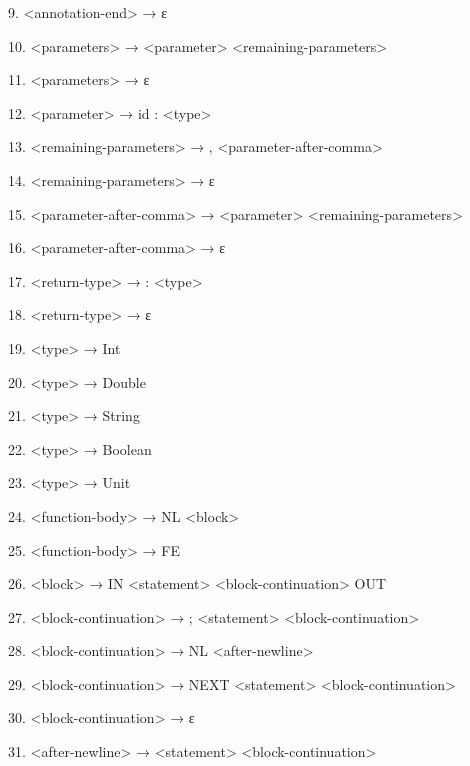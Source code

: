\documentclass{article}
\begin{document}
9. \textless annotation-end\textgreater{} → ε

10. \textless parameters\textgreater{} → \textless parameter\textgreater{} \textless remaining-parameters\textgreater{}

11. \textless parameters\textgreater{} → ε

12. \textless parameter\textgreater{} → id : \textless type\textgreater{}

13. \textless remaining-parameters\textgreater{} → , \textless parameter-after-comma\textgreater{}

14. \textless remaining-parameters\textgreater{} → ε

15. \textless parameter-after-comma\textgreater{} → \textless parameter\textgreater{} \textless remaining-parameters\textgreater{}

16. \textless parameter-after-comma\textgreater{} → ε

17. \textless return-type\textgreater{} → : \textless type\textgreater{}

18. \textless return-type\textgreater{} → ε

19. \textless type\textgreater{} → Int

20. \textless type\textgreater{} → Double

21. \textless type\textgreater{} → String

22. \textless type\textgreater{} → Boolean

23. \textless type\textgreater{} → Unit

24. \textless function-body\textgreater{} → NL \textless block\textgreater{}

25. \textless function-body\textgreater{} → FE

26. \textless block\textgreater{} → IN \textless statement\textgreater{} \textless block-continuation\textgreater{} OUT

27. \textless block-continuation\textgreater{} → ; \textless statement\textgreater{} \textless block-continuation\textgreater{}

28. \textless block-continuation\textgreater{} → NL \textless after-newline\textgreater{}

29. \textless block-continuation\textgreater{} → NEXT \textless statement\textgreater{} \textless block-continuation\textgreater{}

30. \textless block-continuation\textgreater{} → ε

31. \textless after-newline\textgreater{} → \textless statement\textgreater{} \textless block-continuation\textgreater{}
\end{document}
